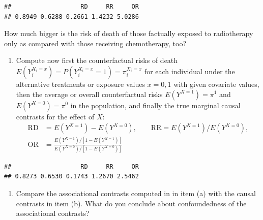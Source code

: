\documentclass[
]{book}
\newenvironment{Shaded}{\begin{snugshade}}{\end{snugshade}}
\newcommand{\AttributeTok}[1]{\textcolor[rgb]{0.13,0.29,0.53}{#1}}
\newcommand{\DecValTok}[1]{\textcolor[rgb]{0.00,0.00,0.81}{#1}}
\newcommand{\FunctionTok}[1]{\textcolor[rgb]{0.13,0.29,0.53}{\textbf{#1}}}
\newcommand{\NormalTok}[1]{#1}
\newcommand{\OtherTok}[1]{\textcolor[rgb]{0.56,0.35,0.01}{#1}}
\newcommand{\SpecialCharTok}[1]{\textcolor[rgb]{0.81,0.36,0.00}{\textbf{#1}}}
\providecommand{\tightlist}{%
  \setlength{\itemsep}{0pt}\setlength{\parskip}{0pt}}
\begin{document}
\begin{verbatim}
##                   RD     RR     OR 
## 0.8949 0.6288 0.2661 1.4232 5.0286
\end{verbatim}

How much bigger is the risk of death of those factually exposed
to radiotherapy only as compared with those receiving chemotherapy, too?

\begin{enumerate}
\def\labelenumi{\arabic{enumi}.}
\setcounter{enumi}{1}
\tightlist
\item
  Compute now first the counterfactual risks of death
  \(E(Y_i^{X_i=x}) = P(Y_i^{X_i=x}=1) = \pi_i^{X_i=x}\)
  for each individual
  under the alternative treatments or exposure values \(x=0,1\)
  with given covariate values, then
  the average or overall counterfactual risks \(E(Y^{X=1}) = \pi^1\)
  and \(E(Y^{X=0}) = \pi^0\) in the population,
  and finally the true marginal causal contrasts for the effect of \(X\):
  \[
  \begin{aligned}
   \text{RD} & = E(Y^{X=1})-E(Y^{X=0}), \qquad  \text{RR} = E(Y^{X=1})/E(Y^{X=0}), \\
   \text{OR} & = \frac{E(Y^{X=1})/[1 -  E(Y^{X=1})]}{E(Y^{X=0})/[1 -  E(Y^{X=0})] }
  \end{aligned}
  \]
\end{enumerate}

\begin{Shaded}
\end{Shaded}

\begin{verbatim}
##                   RD     RR     OR 
## 0.8273 0.6530 0.1743 1.2670 2.5462
\end{verbatim}

\begin{enumerate}
\def\labelenumi{\arabic{enumi}.}
\setcounter{enumi}{2}
\tightlist
\item
  Compare the associational contrasts computed in in item (a) with the
  causal contrasts in item (b). What do you conclude about confoundedness of the associational contrasts?
\end{enumerate}
\end{document}
